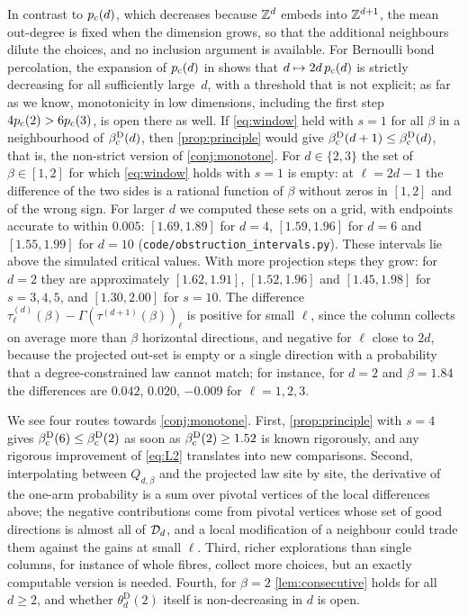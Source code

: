 \documentclass[11pt,letterpaper]{article}
\begin{document}
In contrast to $p_{\mathrm c}(d)$, which decreases because $\mathbb Z^d$ embeds into $\mathbb Z^{d+1}$, the mean out-degree is fixed when the dimension grows, so that the additional neighbours dilute the choices, and no inclusion argument is available. For Bernoulli bond percolation, the expansion of $p_{\mathrm c}(d)$ in \cite{HS95,vdHS06} shows that $d\mapsto2d\,p_{\mathrm c}(d)$ is strictly decreasing for all sufficiently large~$d$, with a threshold that is not explicit; as far as we know, monotonicity in low dimensions, including the first step $4p_{\mathrm c}(2)>6p_{\mathrm c}(3)$, is open there as well.
If \eqref{eq:window} held with $s=1$ for all $\beta$ in a neighbourhood of $\beta_{\mathrm c}^{\mathrm D}(d)$, then \cref{prop:principle} would give $\beta_{\mathrm c}^{\mathrm D}(d+1)\le\beta_{\mathrm c}^{\mathrm D}(d)$, that is, the non-strict version of \cref{conj:monotone}. For $d\in\{2,3\}$ the set of $\beta\in[1,2]$ for which \eqref{eq:window} holds with $s=1$ is empty: at $\ell=2d-1$ the difference of the two sides is a rational function of $\beta$ without zeros in $[1,2]$ and of the wrong sign. For larger $d$ we computed these sets on a grid, with endpoints accurate to within $0.005$: $[1.69,1.89]$ for $d=4$, $[1.59,1.96]$ for $d=6$ and $[1.55,1.99]$ for $d=10$ (\texttt{code/obstruction\_intervals.py}). These intervals lie above the simulated critical values. With more projection steps they grow: for $d=2$ they are approximately $[1.62,1.91]$, $[1.52,1.96]$ and $[1.45,1.98]$ for $s=3,4,5$, and $[1.30,2.00]$ for $s=10$. The difference $\tau^{(d)}_\ell(\beta)-\Gamma(\tau^{(d+1)}(\beta))_\ell$ is positive for small $\ell$, since the column collects on average more than $\beta$ horizontal directions, and negative for $\ell$ close to $2d$, because the projected out-set is empty or a single direction with a probability that a degree-constrained law cannot match; for instance, for $d=2$ and $\beta=1.84$ the differences are $0.042$, $0.020$, $-0.009$ for $\ell=1,2,3$.

We see four routes towards \cref{conj:monotone}. First, \cref{prop:principle} with $s=4$ gives $\beta_{\mathrm c}^{\mathrm D}(6)\le\beta_{\mathrm c}^{\mathrm D}(2)$ as soon as $\beta_{\mathrm c}^{\mathrm D}(2)\ge1.52$ is known rigorously, and any rigorous improvement of \eqref{eq:L2} translates into new comparisons. Second, interpolating between $Q_{d,\beta}$ and the projected law site by site, the derivative of the one-arm probability is a sum over pivotal vertices of the local differences above; the negative contributions come from pivotal vertices whose set of good directions is almost all of $\mathcal D_d$, and a local modification of a neighbour could trade them against the gains at small $\ell$. Third, richer explorations than single columns, for instance of whole fibres, collect more choices, but an exactly computable version is needed. Fourth, for $\beta=2$ \cref{lem:consecutive} holds for all $d\ge2$, and whether $\theta^{\mathrm D}_d(2)$ itself is non-decreasing in $d$ is open.
\end{document}
